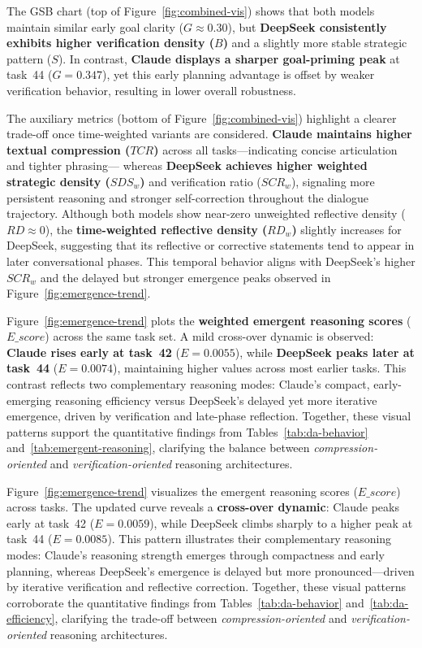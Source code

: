 \documentclass[11pt]{article}
\begin{document}
The GSB chart (top of Figure~\ref{fig:combined-vis}) shows that both models maintain similar early goal clarity ($G{\approx}0.30$),
but \textbf{DeepSeek consistently exhibits higher verification density ($B$)} and a slightly more stable strategic pattern ($S$).
In contrast, \textbf{Claude displays a sharper goal-priming peak} at task~44 ($G{=}0.347$),
yet this early planning advantage is offset by weaker verification behavior, resulting in lower overall robustness.

The auxiliary metrics (bottom of Figure~\ref{fig:combined-vis}) highlight a clearer trade-off once time-weighted variants are considered.
\textbf{Claude maintains higher textual compression ($TCR$)} across all tasks—indicating concise articulation and tighter phrasing—
whereas \textbf{DeepSeek achieves higher weighted strategic density ($SDS_{w}$)} and verification ratio ($SCR_{w}$),
signaling more persistent reasoning and stronger self-correction throughout the dialogue trajectory.
Although both models show near-zero unweighted reflective density ($RD{\approx}0$),
the \textbf{time-weighted reflective density ($RD_{w}$)} slightly increases for DeepSeek,
suggesting that its reflective or corrective statements tend to appear in later conversational phases.
This temporal behavior aligns with DeepSeek’s higher $SCR_{w}$ and the delayed but stronger emergence peaks observed in Figure~\ref{fig:emergence-trend}.

Figure~\ref{fig:emergence-trend} plots the \textbf{weighted emergent reasoning scores} ($E\_score$) across the same task set.
A mild cross-over dynamic is observed: \textbf{Claude rises early at task~42} ($E{=}0.0055$),
while \textbf{DeepSeek peaks later at task~44} ($E{=}0.0074$), maintaining higher values across most earlier tasks.
This contrast reflects two complementary reasoning modes:
Claude’s compact, early-emerging reasoning efficiency versus DeepSeek’s delayed yet more iterative emergence,
driven by verification and late-phase reflection.
Together, these visual patterns support the quantitative findings from Tables~\ref{tab:da-behavior} and~\ref{tab:emergent-reasoning},
clarifying the balance between \emph{compression-oriented} and \emph{verification-oriented} reasoning architectures.


Figure~\ref{fig:emergence-trend} visualizes the emergent reasoning scores ($E\_score$) across tasks.
The updated curve reveals a \textbf{cross-over dynamic}: Claude peaks early at task~42 ($E{=}0.0059$), while DeepSeek climbs sharply to a higher peak at task~44 ($E{=}0.0085$).
This pattern illustrates their complementary reasoning modes:
Claude’s reasoning strength emerges through compactness and early planning,
whereas DeepSeek’s emergence is delayed but more pronounced—driven by iterative verification and reflective correction.
Together, these visual patterns corroborate the quantitative findings from Tables~\ref{tab:da-behavior} and~\ref{tab:da-efficiency},
clarifying the trade-off between \emph{compression-oriented} and \emph{verification-oriented} reasoning architectures.
\end{document}
